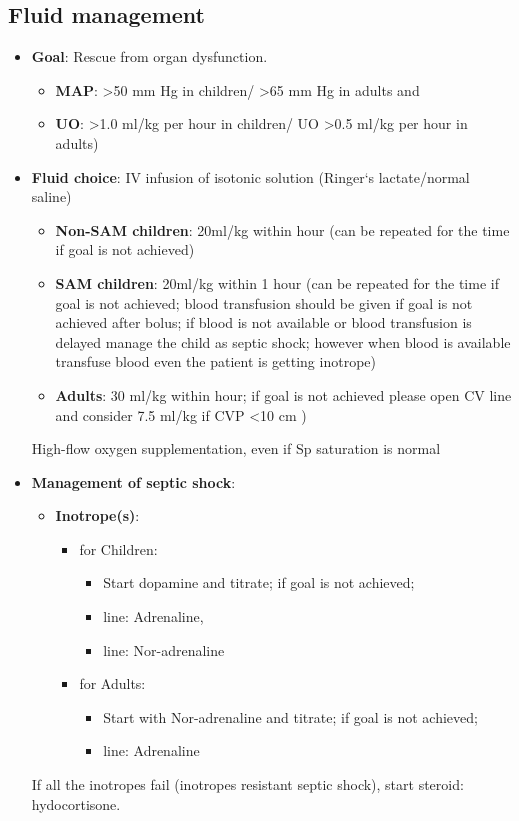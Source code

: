 \documentclass[11pt,a4paper]{report}
\begin{document}
\subsection{Fluid management}
\begin{itemize}
	\item \textbf{Goal}: Rescue from organ dysfunction.
	\begin{itemize}
		\item \textbf{MAP}: \textgreater50 mm Hg in children/ \textgreater65 mm Hg in adults and 
		\item \textbf{UO}: \textgreater1.0 ml/kg per hour in children/ UO \textgreater0.5 ml/kg per hour in adults) 
	\end{itemize}
	
	\item \textbf{Fluid choice}: IV infusion of isotonic solution (Ringer`s lactate/normal saline)
	\begin{itemize}
		\item \textbf{Non-SAM children}: 20ml/kg within  hour (can be repeated for the  time if goal is not achieved)
		\item \textbf{SAM children}: 20ml/kg within 1 hour (can be repeated for the  time if goal is not achieved; blood transfusion should be given if goal is not achieved after  bolus; if blood is not available or blood transfusion is delayed manage the child as septic shock; however when blood is available transfuse blood even the patient is getting inotrope)
		\item \textbf{Adults}: 30 ml/kg within  hour; if goal is not achieved please open CV line and consider 7.5 ml/kg if CVP \textless10 cm )
	\end{itemize}
	High-flow oxygen supplementation, even if Sp saturation is normal
	
	\item \textbf{Management of septic shock}:
	\begin{itemize}
		\item \textbf{Inotrope(s)}: 
		\begin{itemize}
			\item for Children: 
			\begin{itemize}
				\item Start dopamine and titrate; if goal is not achieved; 
				\item {} line: Adrenaline, 
				\item {} line: Nor-adrenaline 
			\end{itemize}
			\item for Adults: 
			\begin{itemize}
				\item Start with Nor-adrenaline and titrate; if goal is not achieved; 
				\item {} line: Adrenaline
			\end{itemize}
		\end{itemize}
	\end{itemize}
	If all the inotropes fail (inotropes resistant septic shock), start steroid: hydocortisone.
\end{itemize}
\end{document}
